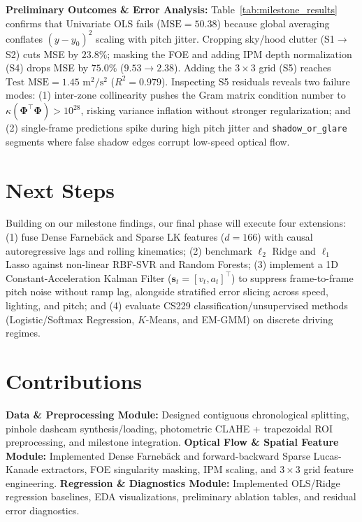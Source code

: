 \documentclass[10pt,twocolumn]{article}
\begin{document}
\textbf{Preliminary Outcomes \& Error Analysis:} Table~\ref{tab:milestone_results} confirms that Univariate OLS fails ($\text{MSE}=50.38$) because global averaging conflates $(y-y_0)^2$ scaling with pitch jitter. Cropping sky/hood clutter (S1$\to$S2) cuts MSE by $23.8\%$; masking the FOE and adding IPM depth normalization (S4) drops MSE by $75.0\%$ ($9.53 \to 2.38$). Adding the $3\times 3$ grid (S5) reaches $\text{Test MSE}=1.45\text{ m}^2/\text{s}^2$ ($R^2=0.979$). Inspecting S5 residuals reveals two failure modes: (1) inter-zone collinearity pushes the Gram matrix condition number to $\kappa(\boldsymbol{\Phi}^\top\boldsymbol{\Phi}) > 10^{28}$, risking variance inflation without stronger regularization; and (2) single-frame predictions spike during high pitch jitter and \texttt{shadow\_or\_glare} segments where false shadow edges corrupt low-speed optical flow.

\section{Next Steps}
Building on our milestone findings, our final phase will execute four extensions: (1) fuse Dense Farneb\"{a}ck and Sparse LK features ($d=166$) with causal autoregressive lags and rolling kinematics; (2) benchmark $\ell_2$ Ridge and $\ell_1$ Lasso against non-linear RBF-SVR and Random Forests; (3) implement a 1D Constant-Acceleration Kalman Filter ($\mathbf{s}_t = [v_t, a_t]^\top$) to suppress frame-to-frame pitch noise without ramp lag, alongside stratified error slicing across speed, lighting, and pitch; and (4) evaluate CS229 classification/unsupervised methods (Logistic/Softmax Regression, $K$-Means, and EM-GMM) on discrete driving regimes.

\section{Contributions}
\noindent\textbf{Data \& Preprocessing Module:} Designed contiguous chronological splitting, pinhole dashcam synthesis/loading, photometric CLAHE + trapezoidal ROI preprocessing, and milestone integration.  
\textbf{Optical Flow \& Spatial Feature Module:} Implemented Dense Farneb\"{a}ck and forward-backward Sparse Lucas-Kanade extractors, FOE singularity masking, IPM scaling, and $3\times 3$ grid feature engineering.  
\textbf{Regression \& Diagnostics Module:} Implemented OLS/Ridge regression baselines, EDA visualizations, preliminary ablation tables, and residual error diagnostics.
\end{document}
